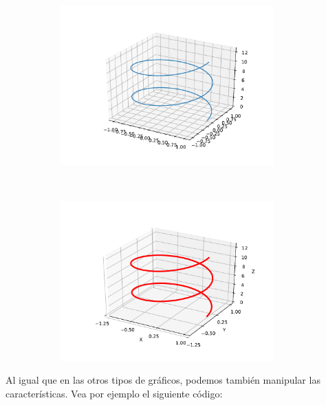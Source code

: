 \begin{figure}[H]
\begin{subfigure}{0.48\textwidth}
\centering
\includegraphics[width=0.9\textwidth]{img/ch03/parametric_curve_01.pdf}
\label{fig:parametric_curve_01}
\end{subfigure}~
\begin{subfigure}{0.48\textwidth}
\centering
\includegraphics[width=0.9\textwidth]{img/ch03/parametric_curve_02.pdf}
\label{fig:parametric_curve_02}
\end{subfigure}

\caption{}
\end{figure}

Al igual que en las otros tipos de gráficos, podemos también manipular las características. Vea por 
ejemplo el siguiente código:

